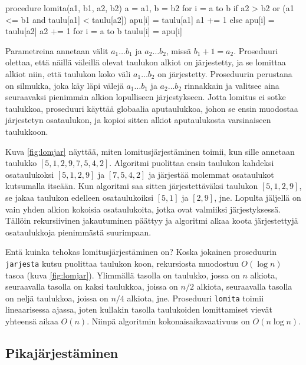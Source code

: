 \begin{code}
procedure lomita(a1, b1, a2, b2)
    a = a1, b = b2
    for i = a to b
        if a2 > b2 or (a1 <= b1 and taulu[a1] < taulu[a2])
            apu[i] = taulu[a1]
            a1 += 1
        else
            apu[i] = taulu[a2]
            a2 += 1
    for i = a to b
        taulu[i] = apu[i]
\end{code}

Parametreina annetaan välit $a_1 \dots b_1$ ja $a_2 \dots b_2$,
missä $b_1+1=a_2$.
Proseduuri olettaa, että näillä väleillä olevat 
taulukon alkiot on järjestetty,
ja se lomittaa alkiot niin, että
taulukon koko väli $a_1 \dots b_2$ on järjestetty.
Proseduurin perustana on silmukka, joka käy läpi välejä
$a_1 \dots b_1$ ja $a_2 \dots b_2$ rinnakkain ja valitsee
aina seuraavaksi pienimmän alkion lopulliseen järjestykseen.
Jotta lomitus ei sotke taulukkoa,
proseduuri käyttää globaalia aputaulukkoa,
johon se ensin muodostaa järjestetyn osataulukon,
ja kopioi sitten alkiot aputaulukosta varsinaiseen taulukkoon.

Kuva \ref{fig:lomjar} näyttää, miten lomitusjärjestäminen
toimii, kun sille annetaan taulukko $[5,1,2,9,7,5,4,2]$.
Algoritmi puolittaa ensin taulukon kahdeksi osataulukoksi
$[5,1,2,9]$ ja $[7,5,4,2]$ ja järjestää molemmat
osataulukot kutsumalla itseään.
Kun algoritmi saa sitten järjestettäväksi taulukon $[5,1,2,9]$,
se jakaa taulukon edelleen osataulukoiksi $[5,1]$ ja $[2,9]$, jne.
Lopulta jäljellä on vain yhden alkion kokoisia
osataulukoita, jotka ovat valmiiksi järjestyksessä.
Tällöin rekursiivinen jakautuminen päättyy ja algoritmi
alkaa koota järjestettyjä osataulukkoja pienimmästä suurimpaan.

Entä kuinka tehokas lomitusjärjestäminen on?
Koska jokainen proseduurin \texttt{jarjesta} kutsu
puolittaa taulukon koon, rekursiosta muodostuu
$O(\log n)$ tasoa  (kuva \ref{fig:lomjar}).
Ylimmällä tasolla on taulukko,
jossa on $n$ alkiota,
seuraavalla tasolla on kaksi taulukkoa,
joissa on $n/2$ alkiota,
seuraavalla tasolla on neljä taulukkoa,
joissa on $n/4$ alkiota, jne.
Proseduuri \texttt{lomita} toimii lineaarisessa ajassa,
joten kullakin tasolla taulukoiden lomittamiset vievät yhteensä
aikaa $O(n)$.
Niinpä algoritmin kokonaisaikavaativuus on $O(n \log n)$.

\subsection{Pikajärjestäminen}


